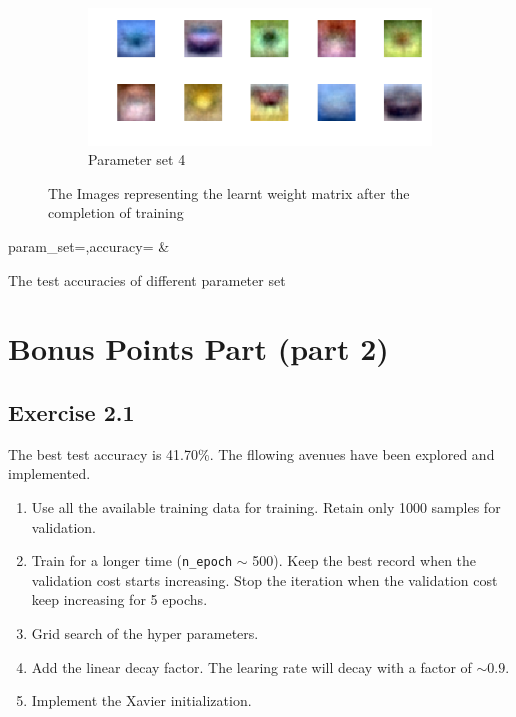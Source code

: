 \documentclass[12pt]{article}
\begin{document}
\begin{figure}
\begin{subfigure}[b]{0.475\textwidth}
        \centering
        \includegraphics[width=\textwidth]{wgt_case4.png}
        \caption[]%
        {{\small Parameter set 4}}
    \end{subfigure}
    \caption[]
    {\small The Images representing the learnt weight matrix after the completion of training}
    \label{fig:wgt_mat}
\end{figure}

\begin{table}
    \centering
    {param_set=\paramset,accuracy=\accuracy}
    {\paramset & \accuracy}
    \caption{The test accuracies of different parameter set}
    \label{table:accuracy}
\end{table}

\section{Bonus Points Part (part 2)}

\subsection{Exercise 2.1}

The best test accuracy is 41.70\%.
The fllowing avenues have been explored and implemented.
\begin{enumerate}
    \item Use all the available training data for training. Retain only 1000 samples
        for validation.
    \item Train for a longer time (\texttt{n\_epoch} $\sim$ 500). Keep the best record
        when the validation cost starts increasing. Stop the iteration when the validation
        cost keep increasing for 5 epochs.
    \item Grid search of the hyper parameters.
    \item Add the linear decay factor. The learing rate will decay with a factor of $\sim 0.9$.
    \item Implement the Xavier initialization.
\end{enumerate}
\end{document}
